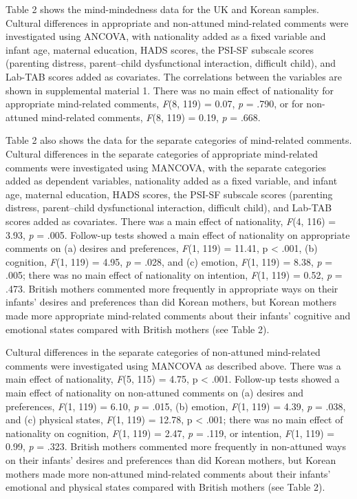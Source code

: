 \documentclass[
]{article}
\begin{document}
Table 2 shows the mind-mindedness data for the UK and Korean samples. Cultural differences in appropriate and non-attuned mind-related comments were investigated using ANCOVA, with nationality added as a fixed variable and infant age, maternal education, HADS scores, the PSI-SF subscale scores (parenting distress, parent--child dysfunctional interaction, difficult child), and Lab-TAB scores added as covariates. The correlations between the variables are shown in supplemental material 1. There was no main effect of nationality for appropriate mind-related comments, \emph{F}(8, 119) = 0.07, \emph{p} = .790, or for non-attuned mind-related comments, \emph{F}(8, 119) = 0.19, \emph{p} = .668.

Table 2 also shows the data for the separate categories of mind-related comments. Cultural differences in the separate categories of appropriate mind-related comments were investigated using MANCOVA, with the separate categories added as dependent variables, nationality added as a fixed variable, and infant age, maternal education, HADS scores, the PSI-SF subscale scores (parenting distress, parent--child dysfunctional interaction, difficult child), and Lab-TAB scores added as covariates. There was a main effect of nationality, \emph{F}(4, 116) = 3.93, \emph{p} = .005. Follow-up tests showed a main effect of nationality on appropriate comments on (a) desires and preferences, \emph{F}(1, 119) = 11.41, p \textless{} .001, (b) cognition, \emph{F}(1, 119) = 4.95, \emph{p} = .028, and (c) emotion, \emph{F}(1, 119) = 8.38, \emph{p} = .005; there was no main effect of nationality on intention, \emph{F}(1, 119) = 0.52, \emph{p} = .473. British mothers commented more frequently in appropriate ways on their infants' desires and preferences than did Korean mothers, but Korean mothers made more appropriate mind-related comments about their infants' cognitive and emotional states compared with British mothers (see Table 2).

Cultural differences in the separate categories of non-attuned mind-related comments were investigated using MANCOVA as described above. There was a main effect of nationality, \emph{F}(5, 115) = 4.75, p \textless{} .001. Follow-up tests showed a main effect of nationality on non-attuned comments on (a) desires and preferences, \emph{F}(1, 119) = 6.10, \emph{p} = .015, (b) emotion, \emph{F}(1, 119) = 4.39, \emph{p} = .038, and (c) physical states, \emph{F}(1, 119) = 12.78, p \textless{} .001; there was no main effect of nationality on cognition, \emph{F}(1, 119) = 2.47, \emph{p} = .119, or intention, \emph{F}(1, 119) = 0.99, \emph{p} = .323. British mothers commented more frequently in non-attuned ways on their infants' desires and preferences than did Korean mothers, but Korean mothers made more non-attuned mind-related comments about their infants' emotional and physical states compared with British mothers (see Table 2).
\end{document}
